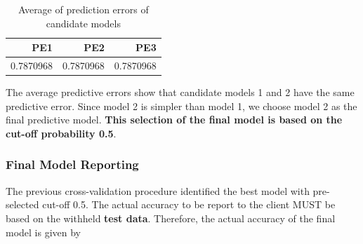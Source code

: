 \documentclass[
]{book}
\newenvironment{Shaded}{\begin{snugshade}}{\end{snugshade}}
\newcommand{\AttributeTok}[1]{\textcolor[rgb]{0.13,0.29,0.53}{#1}}
\newcommand{\FunctionTok}[1]{\textcolor[rgb]{0.13,0.29,0.53}{\textbf{#1}}}
\newcommand{\NormalTok}[1]{#1}
\newcommand{\OtherTok}[1]{\textcolor[rgb]{0.56,0.35,0.01}{#1}}
\newcommand{\SpecialCharTok}[1]{\textcolor[rgb]{0.81,0.36,0.00}{\textbf{#1}}}
\newcommand{\StringTok}[1]{\textcolor[rgb]{0.31,0.60,0.02}{#1}}
\begin{document}
\begin{Shaded}
\end{Shaded}

\begin{table}

\caption{\label{tab:unnamed-chunk-137}Average of prediction errors of candidate models}
\centering
\begin{tabular}[t]{r|r|r}
\hline
PE1 & PE2 & PE3\\
\hline
0.7870968 & 0.7870968 & 0.7870968\\
\hline
\end{tabular}
\end{table}

The average predictive errors show that candidate models 1 and 2 have the same predictive error. Since model 2 is simpler than model 1, we choose model 2 as the final predictive model. \textbf{This selection of the final model is based on the cut-off probability 0.5}.

\hypertarget{final-model-reporting}{%
\subsubsection{Final Model Reporting}\label{final-model-reporting}}

The previous cross-validation procedure identified the best model with pre-selected cut-off 0.5. The actual accuracy to be report to the client MUST be based on the withheld \textbf{test data}. Therefore, the actual accuracy of the final model is given by
\end{document}
